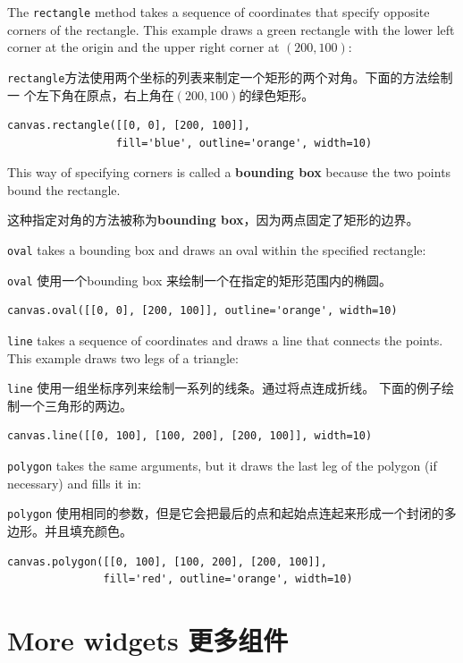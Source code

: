\documentclass[10pt]{book}
\begin{document}
\begin{CJK}{UTF8}{gbsn}
The {\tt rectangle} method takes a sequence of coordinates that
specify opposite corners of the rectangle.  This example
draws a green rectangle with the lower left corner at the origin
and the upper right corner at $(200,100)$:

{\tt rectangle}方法使用两个坐标的列表来制定一个矩形的两个对角。下面的方法绘制一
个左下角在原点，右上角在$(200,100)$的绿色矩形。

\begin{verbatim}
canvas.rectangle([[0, 0], [200, 100]], 
                 fill='blue', outline='orange', width=10)
\end{verbatim}
%
This way of specifying corners is called
a {\bf bounding box} because the two points
bound the rectangle.

这种指定对角的方法被称为{\bf bounding box}，因为两点固定了矩形的边界。

{\tt oval} takes a bounding box and draws an oval
within the specified rectangle:

{\tt oval} 使用一个bounding box 来绘制一个在指定的矩形范围内的椭圆。

\begin{verbatim}
canvas.oval([[0, 0], [200, 100]], outline='orange', width=10)
\end{verbatim}
%
{\tt line} takes a sequence of coordinates and draws
a line that connects the points.  This example draws two legs
of a triangle:

{\tt line} 使用一组坐标序列来绘制一系列的线条。通过将点连成折线。
下面的例子绘制一个三角形的两边。

\begin{verbatim}
canvas.line([[0, 100], [100, 200], [200, 100]], width=10)
\end{verbatim}
%
{\tt polygon} takes the same arguments, but it draws the last
leg of the polygon (if necessary) and fills it in:

{\tt polygon} 使用相同的参数，但是它会把最后的点和起始点连起来形成一个封闭的多
边形。并且填充颜色。

\begin{verbatim}
canvas.polygon([[0, 100], [100, 200], [200, 100]],
               fill='red', outline='orange', width=10)
\end{verbatim}
%


\section{More widgets 更多组件}


\end{CJK}
\end{document}
